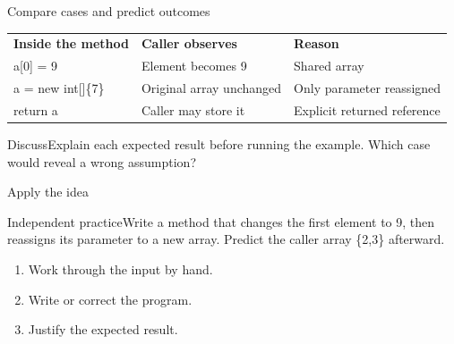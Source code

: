 \documentclass[10pt,aspectratio=169]{beamer}
\begin{document}
\begin{frame}[fragile,t]{Compare cases and predict outcomes}
\small\renewcommand{\arraystretch}{1.5}
\begin{tabularx}{\textwidth}{>{\raggedright\arraybackslash}X>{\raggedright\arraybackslash}X>{\raggedright\arraybackslash}X}\rowcolor{navy}
\color{white}\bfseries Inside the method & \color{white}\bfseries Caller observes & \color{white}\bfseries Reason\\
a[0] = 9 & Element becomes 9 & Shared array\\
a = new int[]\{7\} & Original array unchanged & Only parameter reassigned\\
return a & Caller may store it & Explicit returned reference\\
\end{tabularx}\par\vspace{3mm}\begin{exampleblock}{Discuss}Explain each expected result before running the example. Which case would reveal a wrong assumption?\end{exampleblock}
\end{frame}

\begin{frame}[fragile,t]{Apply the idea}
\begin{alertblock}{Independent practice}Write a method that changes the first element to 9, then reassigns its parameter to a new array. Predict the caller array \{2,3\} afterward.\end{alertblock}\vspace{3mm}\begin{enumerate}\item Work through the input by hand.\item Write or correct the program.\item Justify the expected result.\end{enumerate}
\end{frame}
\end{document}
